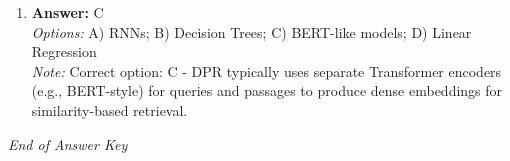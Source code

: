 \documentclass[12pt]{article}
\begin{document}
\begin{enumerate}[label=Q\arabic*.]
\\ \textit{Options:} A) All retrieved docs; B) Relevant docs retrieved out of all relevant ones; C) Model accuracy; D) Token overlap
\\ \textit{Note:} Correct option: B - Recall@$k$ is the fraction of all truly relevant documents that appear in the top-$k$ retrieved set (coverage of relevant items), not raw retrieval count or accuracy.
\item \textbf{Answer:} C
\\ \textit{Options:} A) RNNs; B) Decision Trees; C) BERT-like models; D) Linear Regression
\\ \textit{Note:} Correct option: C - DPR typically uses separate Transformer encoders (e.g., BERT-style) for queries and passages to produce dense embeddings for similarity-based retrieval.
\end{enumerate}

\vfill
\noindent\textit{End of Answer Key}
\end{document}
